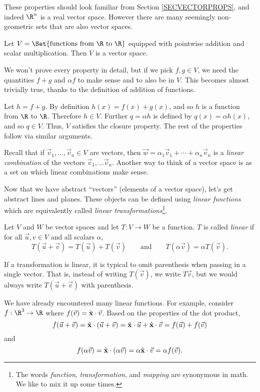 These properties should look familiar from Section \ref{SECVECTORPROPS}, and indeed
$\R^n$ is a real vector space.  However there are many seemingly non-geometric
sets that are also vector spaces.

\begin{example}
	Let $V=\Set{\text{functions from }\R\text{ to }\R}$ equipped with
	pointwise addition and scalar multiplication.  Then $V$ is a vector space.

	We won't prove every property in detail, but if we pick $f,g\in V$,
	we need the quantities $f+g$ and $\alpha f$ to make sense and to also
	be in $V$.  This becomes almost trivially true, thanks to the definition
	of addition of functions.

	Let $h=f+g$.  By definition $h(x) = f(x)+g(x)$, and so $h$ is
	a function from $\R$ to $\R$.  Therefore $h\in V$.  Further
	$q=\alpha h$ is defined by $q(x) = \alpha h(x)$, and so $q\in V$.
	Thus, $V$ satisfies the closure property.  The rest of the properties
	follow via similar arguments.
\end{example}

Recall that if $\vec v_1,\ldots, \vec v_n\in V$ are vectors, then 
$\vec w=\alpha_1\vec v_1+\cdots +\alpha_n\vec v_n$ is a 
\emph{linear combination} of the vectors $\vec v_1,\ldots \vec v_n$.
Another way to think of a vector space is as a set on which linear combinations
make sense.

Now that we have abstract ``vectors'' (elements of a vector space), let's
get abstract lines and planes.  These objects can be defined using
\emph{linear functions} which are equivalently
called \emph{linear transformations}\footnote{ The words \emph{function},
\emph{transformation}, and \emph{mapping} are synonymous in math.  We like
to mix it up some times.}.

\begin{definition}[Linear]
	Let $V$ and $W$ be vector spaces and let
	$T:V\to W$ be a function.  $T$ is called \emph{linear}
	if for all $\vec u,v\in V$ and all scalars $\alpha$,
	\[
		T(\vec u+\vec v) = T(\vec u)+T(\vec v)\qquad\text{and}\qquad
		T(\alpha \vec v) = \alpha T(\vec v).
	\]
\end{definition}
If a transformation is linear, it is typical to omit parenthesis when
passing in a single vector.  That is, instead of writing $T(\vec v)$,
we write $T\vec v$, but we would always write $T(\vec u+\vec v)$
with parenthesis.

We have already encountered many linear functions.  For example, 
consider $f:\R^3\to\R$ where
$f(\vec v) = {\hat {\mathbf x}}\cdot \vec v$.  Based on the properties of the dot product,
\[
	f(\vec u+\vec v) = {\hat {\mathbf x}}\cdot (\vec u+\vec v)=
	{\hat {\mathbf x}}\cdot \vec u+{\hat {\mathbf x}} \cdot \vec v = f(\vec u)+f(\vec v)
\]
and 
\[
	f(\alpha \vec v) = {\hat {\mathbf x}} \cdot (\alpha \vec v) = \alpha {\hat {\mathbf x}} \cdot \vec v
	=\alpha f(\vec v).
\]

